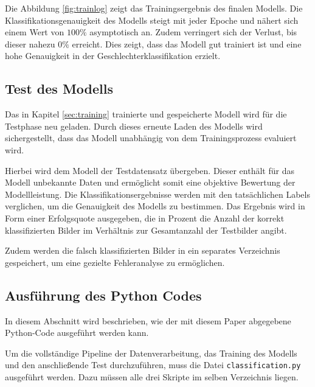 \documentclass[journal,twoside,web]{ieeecolor}
\begin{document}
Die Abbildung \ref{fig:trainlog} zeigt das Trainingsergebnis des finalen Modells. Die Klassifikationsgenauigkeit des Modells steigt mit jeder Epoche und nähert sich einem Wert von $100 \%$ asymptotisch an. Zudem verringert sich der Verlust, bis dieser nahezu $0 \%$ erreicht. Dies zeigt, dass das Modell gut trainiert ist und eine hohe Genauigkeit in der Geschlechterklassifikation erzielt.



\subsection{Test des Modells}
Das in Kapitel \ref{sec:training} trainierte und gespeicherte Modell wird für die Testphase neu geladen. Durch dieses erneute Laden des Modells wird sichergestellt, dass das Modell unabhängig von dem Trainingsprozess evaluiert wird.

Hierbei wird dem Modell der Testdatensatz übergeben. Dieser enthält für das Modell unbekannte Daten und ermöglicht somit eine objektive Bewertung der Modellleistung. Die Klassifikationsergebnisse werden mit den tatsächlichen Labels verglichen, um die Genauigkeit des Modells zu bestimmen. Das Ergebnis wird in Form einer Erfolgsquote ausgegeben, die in Prozent die Anzahl der korrekt klassifizierten Bilder im Verhältnis zur Gesamtanzahl der Testbilder angibt.

Zudem werden die falsch klassifizierten Bilder in ein separates Verzeichnis gespeichert, um eine gezielte Fehleranalyse zu ermöglichen. %


\subsection{Ausführung des Python Codes}

In diesem Abschnitt wird beschrieben, wie der mit diesem Paper abgegebene Python-Code ausgeführt werden kann.

Um die vollständige Pipeline der Datenverarbeitung, das Training des Modells und den anschließende Test durchzuführen, muss die Datei \texttt{classification.py} ausgeführt werden. Dazu müssen alle drei Skripte im selben Verzeichnis liegen.
\end{document}
